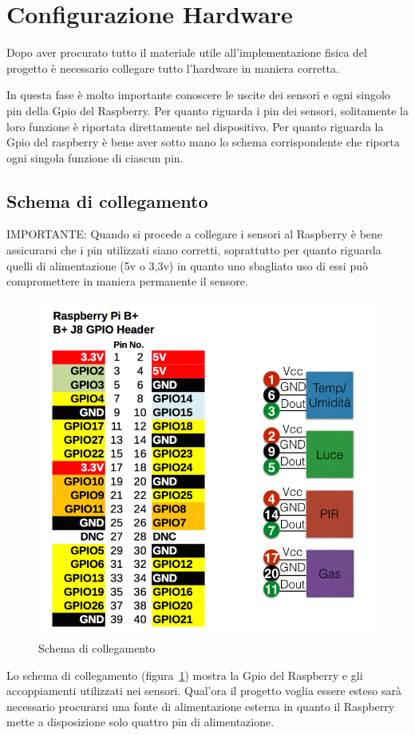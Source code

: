 \section{Configurazione Hardware}

Dopo aver procurato tutto il materiale utile all'implementazione fisica del progetto è necessario collegare tutto l'hardware in maniera corretta.

In questa fase è molto importante conoscere le uscite dei sensori e ogni singolo pin della Gpio del Raspberry. Per quanto riguarda i pin dei sensori, solitamente la loro funzione è riportata direttamente nel dispositivo. Per quanto riguarda la Gpio del raspberry è bene aver sotto mano lo schema corrispondente che riporta ogni singola funzione di ciascun pin.


\subsection{Schema di collegamento}

IMPORTANTE: Quando si procede a collegare i sensori al Raspberry è bene assicurarsi che i pin utilizzati siano corretti, soprattutto per quanto riguarda quelli di alimentazione (5v o 3,3v) in quanto uno sbagliato uso di essi può compromettere in maniera permanente il sensore.

\begin{figure}
	\centering
	\includegraphics[width=0.7\linewidth]{Figures/Sensors&Rasp/hardwareconfig}
	\caption[confighardware]{Schema di collegamento}
	\label{fig:config}
\end{figure}



Lo schema di collegamento (figura~\ref{fig:config}) mostra la Gpio del Raspberry e gli accoppiamenti utilizzati nei sensori. Qual'ora il progetto voglia essere esteso sarà necessario procurarsi una fonte di alimentazione esterna in quanto il Raspberry mette a disposizione solo quattro pin di alimentazione.

\newpage